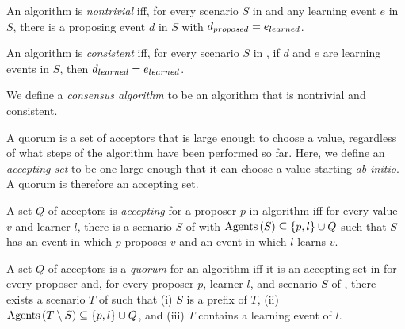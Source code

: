 \begin{asyncdef}[Nontriviality]
    An algorithm \Alg is \emph{nontrivial} iff, for every scenario $S$ in \Alg and any learning event $e$ in $S$, there is a proposing event $d$ in $S$ with $d_{proposed} = e_{learned}$.
\end{asyncdef}

\begin{asyncdef}[Consistency]
    An algorithm \Alg is \emph{consistent} iff, for every scenario $S$ in \Alg, if $d$ and $e$ are learning events in $S$, then $d_{learned} = e_{learned}$.
\end{asyncdef}

We define a \emph{consensus algorithm} to be an algorithm that is nontrivial and consistent.


A quorum is a set of acceptors that is large enough to choose a value, regardless of what steps of the algorithm have been performed so far.
Here, we define an \emph{accepting set} to be one large enough that it can choose a value starting \emph{ab initio}.
A quorum is therefore an accepting set.

\begin{asyncdef}
    A set $Q$ of acceptors is \emph{accepting} for a proposer $p$ in algorithm \Alg iff for every value $v$ and learner $l$, there is a scenario $S$ of \Alg with $\operatorname{Agents}\left(S\right) \subseteq \{p, l\} \cup Q$ such that $S$ has an event in which $p$ proposes $v$ and an event in which $l$ learns $v$.
\end{asyncdef}


\begin{asyncdef}[Quorum]
    A set $Q$ of acceptors is a \emph{quorum} for an algorithm \Alg iff it is an accepting set in \Alg for every proposer and, for every proposer $p$, learner $l$, and scenario $S$ of \Alg, there exists a scenario $T$ of \Alg such that (i) $S$ is a prefix of $T$, (ii) $\operatorname{Agents}\left(T\setminus S\right) \subseteq \{p, l\}\cup Q$, and (iii) $T$ contains a learning event of $l$.
\end{asyncdef}
